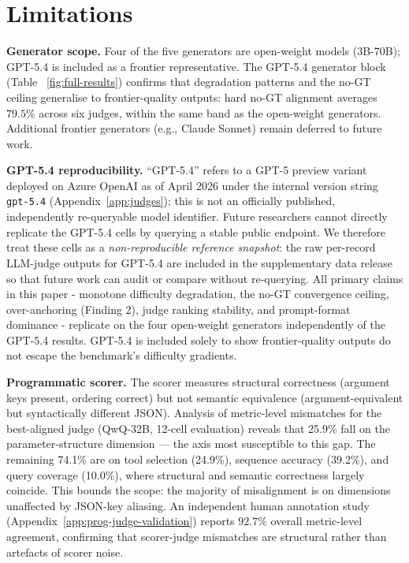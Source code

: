 \section{Limitations}
\label{app:limitations}

\textbf{Generator scope.} Four of the five generators are open-weight models (3B-70B); GPT-5.4 is included as a frontier representative. The GPT-5.4 generator block (Table ~\ref{fig:full-results}) confirms that degradation patterns and the no-GT ceiling generalise to frontier-quality outputs: hard no-GT alignment averages $79.5\%$ across six judges, within the same band as the open-weight generators. Additional frontier generators (e.g., Claude Sonnet) remain deferred to future work.

\textbf{GPT-5.4 reproducibility.} ``GPT-5.4'' refers to a GPT-5 preview variant deployed on Azure OpenAI as of April 2026 under the internal version string \texttt{gpt-5.4} (Appendix~\ref{app:judges}); this is not an officially published, independently re-queryable model identifier. Future researchers cannot directly replicate the GPT-5.4 cells by querying a stable public endpoint. We therefore treat these cells as a \emph{non-reproducible reference snapshot}: the raw per-record LLM-judge outputs for GPT-5.4 are included in the supplementary data release so that future work can audit or compare without re-querying. All primary claims in this paper - monotone difficulty degradation, the no-GT convergence ceiling, over-anchoring (Finding 2), judge ranking stability, and prompt-format dominance - replicate on the four open-weight generators independently of the GPT-5.4 results. GPT-5.4 is included solely to show frontier-quality outputs do not escape the benchmark's difficulty gradients.

\textbf{Programmatic scorer.} The scorer measures structural correctness (argument keys present, ordering correct) but not semantic equivalence (argument-equivalent but syntactically different JSON). Analysis of metric-level mismatches for the best-aligned judge (QwQ-32B, 12-cell evaluation) reveals that 25.9\% fall on the parameter-structure dimension — the axis most susceptible to this gap. The remaining 74.1\% are on tool selection (24.9\%), sequence accuracy (39.2\%), and query coverage (10.0\%), where structural and semantic correctness largely coincide. This bounds the scope: the majority of misalignment is on dimensions unaffected by JSON-key aliasing. An independent human annotation study (Appendix~\ref{app:prog-judge-validation}) reports $92.7\%$ overall metric-level agreement, confirming that scorer-judge mismatches are structural rather than artefacts of scorer noise.

